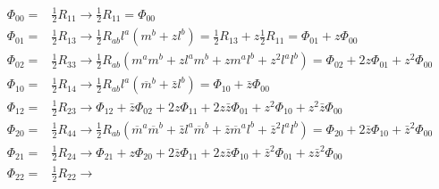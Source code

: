 \begin{align*}
    \Phi_{00}=& \frac{1}{2} R_{11} \to \frac{1}{2}R_{11}= \Phi_{00} \\
    \Phi_{01}=& \frac{1}{2} R_{13} \to \frac{1}{2}R_{ab}l^a (m^b + z l^b)
    =\frac{1}{2}R_{13} + z\frac{1}{2}R_{11} = \Phi_{01} + z \Phi_{00} \\
    \Phi_{02}=& \frac{1}{2} R_{33} \to %
    \frac{1}{2}R_{ab}(m^am^b + z l^am^b+ zm^al^b + z^2 l^al^b) 
    =\Phi_{02}+ 2z\Phi_{01} + z^2 \Phi_{00} \\
    \Phi_{10}=& \frac{1}{2} R_{14} \to \frac{1}{2}R_{ab}l^a(\overline{m}^b + \bar{z} l^b)
    = \Phi_{10} + \bar{z} \Phi_{00} \\
    \Phi_{12}=& \frac{1}{2} R_{23} \to %
    \Phi_{12}+\bar{z}\Phi_{02}+2z\Phi_{11} +2z\bar{z}\Phi_{01}
    +z^2 \Phi_{10} + z^2\bar{z} \Phi_{00} \\
    \Phi_{20}=& \frac{1}{2} R_{44} \to \frac{1}{2}R_{ab}
    (\overline{m}^a\overline{m}^b + \bar{z} l^a\overline{m}^b
    +\bar{z}\overline{m}^al^b + \bar{z}^2 l^al^b)
    =\Phi_{20}+ 2\bar{z}\Phi_{10} + \bar{z}^2 \Phi_{00} \\
    \Phi_{21}=& \frac{1}{2} R_{24} \to  %
    \Phi_{21}+ {z}\Phi_{20}+2\bar{z}\Phi_{11}
    +2z\bar{z}\Phi_{10} +\bar{z}^2 \Phi_{01} + z\bar{z}^2 \Phi_{00}\\
    \Phi_{22}=& \frac{1}{2} R_{22} \to %

\end{align*}
